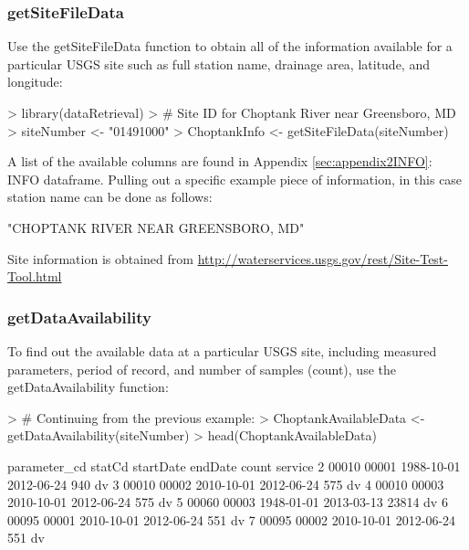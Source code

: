 \documentclass[a4paper,11pt]{article}
\begin{document}
\subsubsection{getSiteFileData}
\label{sec:usgsSiteFileData}
Use the getSiteFileData function to obtain all of the information available for a particular USGS site such as full station name, drainage area, latitude, and longitude:


\begin{Schunk}
\begin{Sinput}
> library(dataRetrieval)
> # Site ID for Choptank River near Greensboro, MD
> siteNumber <- "01491000" 
> ChoptankInfo <- getSiteFileData(siteNumber)
\end{Sinput}
\end{Schunk}

A list of the available columns are found in Appendix \ref{sec:appendix2INFO}: INFO dataframe. Pulling out a specific example piece of information, in this case station name can be done as follows:

\begin{Schunk}
\begin{Soutput}
[1] "CHOPTANK RIVER NEAR GREENSBORO, MD"
\end{Soutput}
\end{Schunk}
Site information is obtained from \url{http://waterservices.usgs.gov/rest/Site-Test-Tool.html}
\FloatBarrier
\subsubsection{getDataAvailability}
\label{sec:usgsDataAvailability}
To find out the available data at a particular USGS site, including measured parameters, period of record, and number of samples (count), use the getDataAvailability function:

\begin{Schunk}
\begin{Sinput}
> # Continuing from the previous example:
> ChoptankAvailableData <- getDataAvailability(siteNumber)
> head(ChoptankAvailableData)
\end{Sinput}
\begin{Soutput}
  parameter_cd statCd  startDate    endDate count service
2        00010  00001 1988-10-01 2012-06-24   940      dv
3        00010  00002 2010-10-01 2012-06-24   575      dv
4        00010  00003 2010-10-01 2012-06-24   575      dv
5        00060  00003 1948-01-01 2013-03-13 23814      dv
6        00095  00001 2010-10-01 2012-06-24   551      dv
7        00095  00002 2010-10-01 2012-06-24   551      dv
\end{Soutput}
\end{Schunk}
\end{document}
